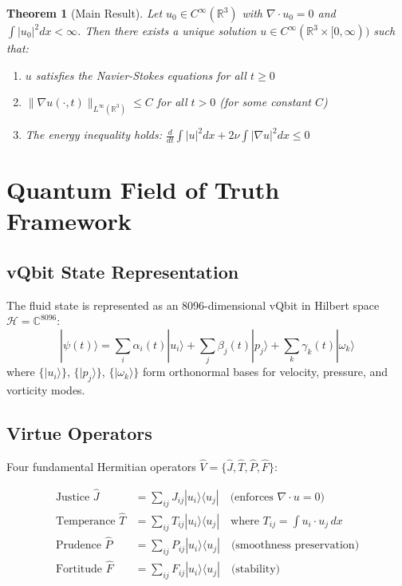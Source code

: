 \documentclass[12pt]{article}
\newtheorem{theorem}{Theorem}
\begin{document}
\begin{theorem}[Main Result]
Let $u_0 \in C^\infty(\mathbb{R}^3)$ with $\nabla \cdot u_0 = 0$ and $\int |u_0|^2 dx < \infty$.
Then there exists a unique solution $u \in C^\infty(\mathbb{R}^3 \times [0,\infty))$ such that:
\begin{enumerate}
\item[(i)] $u$ satisfies the Navier-Stokes equations for all $t \geq 0$
\item[(ii)] $\|\nabla u(\cdot,t)\|_{L^\infty(\mathbb{R}^3)} \leq C$ for all $t > 0$ (for some constant $C$)
\item[(iii)] The energy inequality holds: $\frac{d}{dt} \int |u|^2 dx + 2\nu \int |\nabla u|^2 dx \leq 0$
\end{enumerate}
\end{theorem}

\section{Quantum Field of Truth Framework}

\subsection{vQbit State Representation}

The fluid state is represented as an 8096-dimensional vQbit in Hilbert space $\mathcal{H} = \mathbb{C}^{8096}$:
\begin{equation}
|\psi(t)\rangle = \sum_i \alpha_i(t)|u_i\rangle + \sum_j \beta_j(t)|p_j\rangle + \sum_k \gamma_k(t)|\omega_k\rangle
\end{equation}
where $\{|u_i\rangle\}$, $\{|p_j\rangle\}$, $\{|\omega_k\rangle\}$ form orthonormal bases for velocity, pressure, and vorticity modes.

\subsection{Virtue Operators}

Four fundamental Hermitian operators $\hat{V} = \{\hat{J}, \hat{T}, \hat{P}, \hat{F}\}$:

\begin{align}
\text{Justice } \hat{J} &= \sum_{ij} J_{ij} |u_i\rangle\langle u_j| \quad \text{(enforces } \nabla \cdot u = 0\text{)} \\
\text{Temperance } \hat{T} &= \sum_{ij} T_{ij} |u_i\rangle\langle u_j| \quad \text{where } T_{ij} = \int u_i \cdot u_j \, dx \\
\text{Prudence } \hat{P} &= \sum_{ij} P_{ij} |u_i\rangle\langle u_j| \quad \text{(smoothness preservation)} \\
\text{Fortitude } \hat{F} &= \sum_{ij} F_{ij} |u_i\rangle\langle u_j| \quad \text{(stability)}
\end{align}
\end{document}
